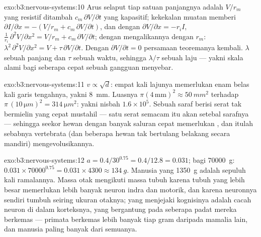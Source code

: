 \begin{solution}{exo:b3:nervous-systems:10}
Arus selaput tiap satuan panjangnya adalah $V/r_{m}$ yang resistif ditambah
$c_{m}\,\partial V/\partial t$ yang kapasitif; kekekalan muatan memberi
$\partial I/\partial x = -(V/r_{m} + c_{m}\,\partial V/\partial t)$, dan
dengan $\partial V/\partial x = -r_{i}I$, $\frac{1}{r_{i}}\,\partial^{2}V/
\partial x^{2} = V/r_{m} + c_{m}\,\partial V/\partial t$; dengan mengalikannya dengan
$r_{m}$: $\lambda^{2}\,\partial^{2}V/\partial x^{2} = V + \tau\,\partial
V/\partial t$. Dengan $\partial V/\partial t = 0$ persamaan teoremanya
kembali. $\lambda$ sebuah panjang dan $\tau$ sebuah waktu, sehingga $\lambda/\tau$
sebuah laju --- yakni skala alami bagi seberapa cepat sebuah gangguan menyebar.
\end{solution}

\begin{solution}{exo:b3:nervous-systems:11}
$v \propto \sqrt{d}$: empat kali lajunya memerlukan enam belas kali
garis tengahnya, yakni \qty{8}{mm}. Luasnya $\pi(4\,\text{mm})^{2} \approx \qty{50}{mm^2}$
terhadap $\pi\,(10\,\unit{\micro m})^{2} = \qty{314}{\micro m^2}$: yakni nisbah
$1.6\times 10^{5}$. Sebuah saraf berisi serat tak bermielin yang cepat mustahil
--- satu serat semacam itu akan setebal sarafnya --- sehingga seekor hewan dengan
banyak saluran cepat memerlukan , dan itulah sebabnya vertebrata (dan beberapa
hewan tak bertulang belakang secara mandiri) mengevolusikannya.
\end{solution}

\begin{solution}{exo:b3:nervous-systems:12}
$a = 0.4/30^{0.75} = 0.4/12.8 = 0.031$; bagi \qty{70000}{g}: $0.031\times
\num{70000}^{0.75} = 0.031\times 4300 \approx \qty{134}{g}$. Manusia yang
\qty{1350}{g} adalah sepuluh kali ramalannya. Massa otak mengikuti massa
tubuh karena tubuh yang lebih besar memerlukan lebih banyak neuron indra dan motorik, dan
karena neuronnya sendiri tumbuh seiring ukuran otaknya; yang menjejaki kognisinya
adalah cacah neuron di dalam korteksnya, yang bergantung pada seberapa padat
mereka berkemas --- primata berkemas lebih banyak tiap gram daripada mamalia lain,
dan manusia paling banyak dari semuanya.
\end{solution}

